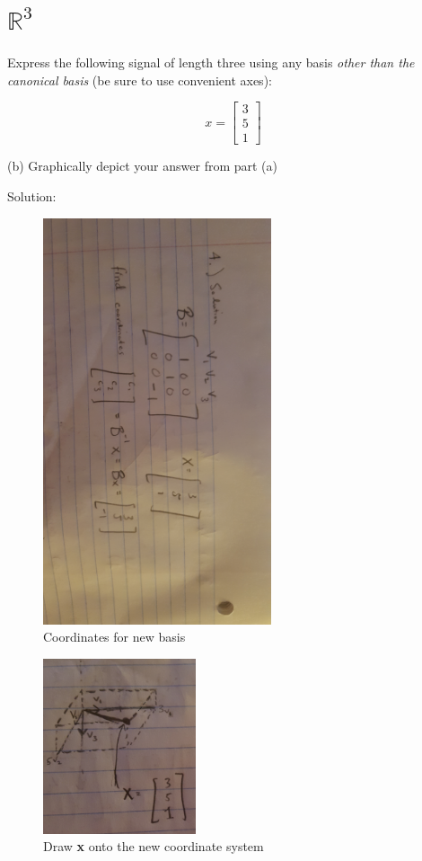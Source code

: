 \documentclass[11pt]{article}
\begin{document}
\section{$\mathbb{R}^3$}
Express the following signal of length three using any basis \emph{other than the canonical basis} (be sure to use convenient axes):

\begin{center}


\[
x = 
\begin{bmatrix}
   3 \\
   5 \\
   1         
\end{bmatrix}
\]


\end{center}

(b) Graphically depict your answer from part (a)

\newpage

Solution:


\begin{figure}[h]
\centering
\includegraphics[width=0.6\textwidth]{coordinates.jpg}
\caption {Coordinates for new basis}
\end{figure}

\begin{figure}[h]
\centering
\includegraphics[width=0.4\textwidth]{graphicaldepiction.jpg}
\caption {Draw \textbf{x} onto the new coordinate system}
\end{figure}
\end{document}
